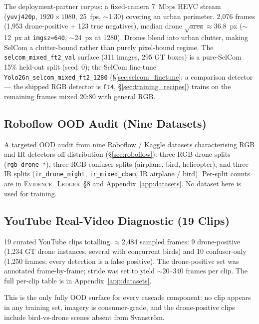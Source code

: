 The deployment-partner corpus: a fixed-camera 7~Mbps HEVC stream (\texttt{yuvj420p}, $1920{\times}1080$, 25~fps, $\sim$1:30) covering an urban perimeter. 2{,}076 frames (1{,}953 drone-positive + 123 true negatives), median drone $\sqrt{\text{area}} \approx 36.8$~px ($\sim$12~px at \texttt{imgsz=640}, $\sim$24~px at 1280). Drones blend into urban clutter, making SelCom a clutter-bound rather than purely pixel-bound regime. The \texttt{selcom\_mixed\_ft2\_val} surface (311 images, 295 GT boxes) is a pure-SelCom 15\% held-out split (seed~0); the SelCom fine-tune \texttt{Yolo26n\_selcom\_mixed\_ft2\_1280} (\S\ref{sec:selcom_finetune}; a comparison detector --- the shipped RGB detector is \texttt{ft4}, \S\ref{sec:training_recipes}) trains on the remaining frames mixed 20:80 with general RGB.

\subsection{Roboflow OOD Audit (Nine Datasets)}
\label{sec:ds_roboflow}

A targeted OOD audit from nine Roboflow / Kaggle datasets characterising RGB and IR detectors off-distribution (\S\ref{sec:roboflow}): three RGB-drone splits (\texttt{rgb\_drone\_*}), three RGB-confuser splits (airplane, bird, helicopter), and three IR splits (\texttt{ir\_drone\_night}, \texttt{ir\_mixed\_cbam}, IR airplane / bird). Per-split counts are in \textsc{Evidence\_Ledger}~\S8 and Appendix~\ref{app:datasets}. No dataset here is used for training.

\subsection{YouTube Real-Video Diagnostic (19 Clips)}
\label{sec:ds_youtube}

19 curated YouTube clips totalling $\approx$2{,}484 sampled frames: 9 drone-positive (1{,}234 GT drone instances, several with concurrent birds) and 10 confuser-only (1{,}250 frames; every detection is a false positive). The drone-positive set was annotated frame-by-frame; stride was set to yield $\sim$20--340 frames per clip. The full per-clip table is in Appendix~\ref{app:datasets}.

This is the only fully OOD surface for every cascade component: no clip appears in any training set, imagery is consumer-grade, and the drone-positive clips include bird-vs-drone scenes absent from Svanstr\"om.

